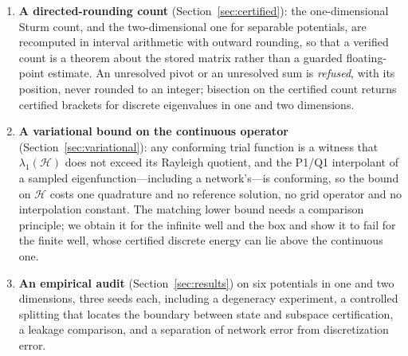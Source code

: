 \begin{enumerate}
  certificate in four ways: to remove leakage from the training residual by
  evaluating the energy at the Rayleigh quotient of the current iterate, to
  select the truncation order of a Dirichlet spectral filter a posteriori
  without any reference, and to carry the certified angle bound back to the
  unfiltered network output through an elementary transport inequality, and
  to decide which sets of independent outputs actually span a degenerate
  level (Section~\ref{sec:deg-results}).
\item \textbf{A directed-rounding count} (Section~\ref{sec:certified}): the
  one-dimensional Sturm count, and the two-dimensional one for separable
  potentials, are recomputed in interval arithmetic with outward rounding, so
  that a verified count is a theorem about the stored matrix rather than a
  guarded floating-point estimate. An unresolved pivot or an unresolved sum
  is \emph{refused}, with its position, never rounded to an integer; bisection
  on the certified count returns certified brackets for discrete eigenvalues
  in one and two dimensions.
\item \textbf{A variational bound on the continuous operator}
  (Section~\ref{sec:variational}): any conforming trial function is a witness
  that $\lambda_1(\mathcal H)$ does not exceed its Rayleigh quotient, and the
  P1/Q1 interpolant of a sampled eigenfunction---including a network's---is
  conforming, so the bound on $\mathcal H$ costs one quadrature and no
  reference solution, no grid operator and no interpolation constant. The
  matching lower bound needs a comparison principle; we obtain it for the
  infinite well and the box and show it to fail for the finite well, whose
  certified discrete energy can lie above the continuous one.
\item \textbf{An empirical audit} (Section~\ref{sec:results}) on six
  potentials in one and two dimensions, three seeds each, including a
  degeneracy experiment, a controlled splitting that locates the boundary
  between state and subspace certification, a leakage comparison, and a
  separation of network error from discretization error.
\end{enumerate}


